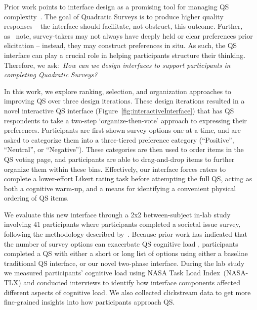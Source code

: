 
Prior work points to interface design as a promising tool for managing QS complexity~\cite{engstrom2020politics, weijtersEffectRatingScale2010, kierujVariationsResponseStyle2010, toepoelSmileysStarsHearts2019, farzandAestheticsEvaluatingResponse2024, xiaoTellMeYourself2020, pielotDidYouMisclick2024}. The goal of Quadratic Surveys is to produce higher quality responses --  the interface should facilitate, not obstruct, this outcome. Further, as~\textcite{lichtensteinConstructionPreference2006} note, survey-takers may not always have deeply held or clear preferences prior elicitation -- instead, they may construct preferences in situ. As such, the QS interface can play a crucial role in helping participants structure their thinking. Therefore, we ask:~\textit{How can we design interfaces to support participants in completing Quadratic Surveys?}

In this work, we explore ranking, selection, and organization approaches to improving QS over three design iterations. These design iterations resulted in a novel interactive QS interface (Figure~\ref{fig:interactiveInterface}) that has QS respondents to take a two-step `organize-then-vote' approach to expressing their preferences. Participants are first shown survey options one-at-a-time, and are asked to categorize them into a three-tiered preference category (``Positive'', ``Neutral'', or ``Negative''). These categories are then used to order items in the QS voting page, and participants are able to drag-and-drop items to further organize them within these bins. Effectively, our interface forces raters to complete a lower-effort Likert rating task before attempting the full QS, acting as both a cognitive warm-up, and a means for identifying a convenient physical ordering of QS items.

We evaluate this new interface through a 2x2 between-subject in-lab study involving 41 participants where participants completed a societal issue survey, following the methodology described by~\textcite{chengCanShowWhat2021}. Because prior work has indicated that the number of survey options can exacerbate QS cognitive load \cite{lenznerCognitiveBurdenSurvey2010, blessAskingDifficultQuestions1992}, participants completed a QS with either a short or long list of options using either a baseline traditional QS interface, or our novel two-phase interface. During the lab study we measured participants' cognitive load using NASA Task Load Index~(NASA-TLX) and conducted interviews to identify how interface components affected different aspects of cognitive load. We also collected clickstream data to get more fine-grained insights into how participants approach QS. 

